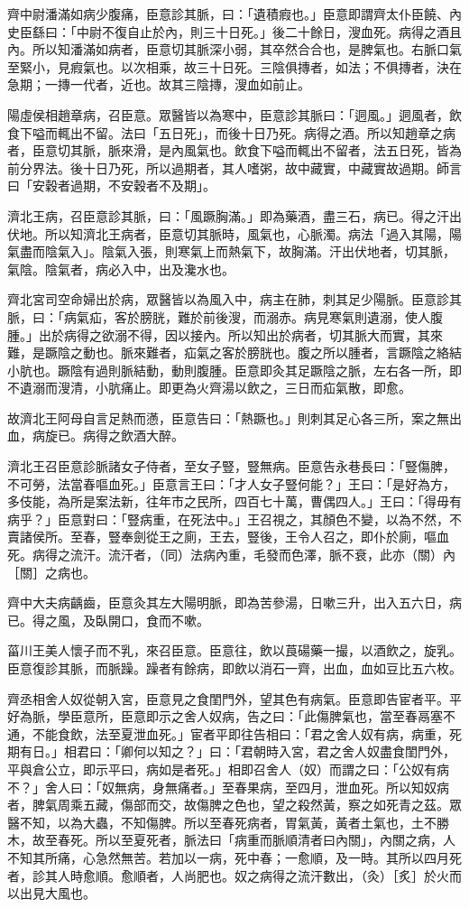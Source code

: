 \begin{pinyinscope}
齊中尉潘滿如病少腹痛，臣意診其脈，曰：「遺積瘕也。」臣意即謂齊太仆臣饒、內史臣繇曰：「中尉不復自止於內，則三十日死。」後二十餘日，溲血死。病得之酒且內。所以知潘滿如病者，臣意切其脈深小弱，其卒然合合也，是脾氣也。右脈口氣至緊小，見瘕氣也。以次相乘，故三十日死。三陰俱摶者，如法；不俱摶者，決在急期；一摶一代者，近也。故其三陰摶，溲血如前止。

陽虛侯相趙章病，召臣意。眾醫皆以為寒中，臣意診其脈曰：「迵風。」迵風者，飲食下嗌而輒出不留。法曰「五日死」，而後十日乃死。病得之酒。所以知趙章之病者，臣意切其脈，脈來滑，是內風氣也。飲食下嗌而輒出不留者，法五日死，皆為前分界法。後十日乃死，所以過期者，其人嗜粥，故中藏實，中藏實故過期。師言曰「安穀者過期，不安穀者不及期」。

濟北王病，召臣意診其脈，曰：「風蹶胸滿。」即為藥酒，盡三石，病已。得之汗出伏地。所以知濟北王病者，臣意切其脈時，風氣也，心脈濁。病法「過入其陽，陽氣盡而陰氣入」。陰氣入張，則寒氣上而熱氣下，故胸滿。汗出伏地者，切其脈，氣陰。陰氣者，病必入中，出及瀺水也。

齊北宮司空命婦出於病，眾醫皆以為風入中，病主在肺，刺其足少陽脈。臣意診其脈，曰：「病氣疝，客於膀胱，難於前後溲，而溺赤。病見寒氣則遺溺，使人腹腫。」出於病得之欲溺不得，因以接內。所以知出於病者，切其脈大而實，其來難，是蹶陰之動也。脈來難者，疝氣之客於膀胱也。腹之所以腫者，言蹶陰之絡結小肮也。蹶陰有過則脈結動，動則腹腫。臣意即灸其足蹶陰之脈，左右各一所，即不遺溺而溲清，小肮痛止。即更為火齊湯以飲之，三日而疝氣散，即愈。

故濟北王阿母自言足熱而懣，臣意告曰：「熱蹶也。」則刺其足心各三所，案之無出血，病旋已。病得之飲酒大醉。

濟北王召臣意診脈諸女子侍者，至女子豎，豎無病。臣意告永巷長曰：「豎傷脾，不可勞，法當春嘔血死。」臣意言王曰：「才人女子豎何能？」王曰：「是好為方，多伎能，為所是案法新，往年市之民所，四百七十萬，曹偶四人。」王曰：「得毋有病乎？」臣意對曰：「豎病重，在死法中。」王召視之，其顏色不變，以為不然，不賣諸侯所。至春，豎奉劍從王之廁，王去，豎後，王令人召之，即仆於廁，嘔血死。病得之流汗。流汗者，（同）法病內重，毛發而色澤，脈不衰，此亦（關）內［關］之病也。

齊中大夫病齲齒，臣意灸其左大陽明脈，即為苦參湯，日嗽三升，出入五六日，病已。得之風，及臥開口，食而不嗽。

菑川王美人懷子而不乳，來召臣意。臣意往，飲以莨碭藥一撮，以酒飲之，旋乳。臣意復診其脈，而脈躁。躁者有餘病，即飲以消石一齊，出血，血如豆比五六枚。

齊丞相舍人奴從朝入宮，臣意見之食閨門外，望其色有病氣。臣意即告宦者平。平好為脈，學臣意所，臣意即示之舍人奴病，告之曰：「此傷脾氣也，當至春鬲塞不通，不能食飲，法至夏泄血死。」宦者平即往告相曰：「君之舍人奴有病，病重，死期有日。」相君曰：「卿何以知之？」曰：「君朝時入宮，君之舍人奴盡食閨門外，平與倉公立，即示平曰，病如是者死。」相即召舍人（奴）而謂之曰：「公奴有病不？」舍人曰：「奴無病，身無痛者。」至春果病，至四月，泄血死。所以知奴病者，脾氣周乘五藏，傷部而交，故傷脾之色也，望之殺然黃，察之如死青之茲。眾醫不知，以為大蟲，不知傷脾。所以至春死病者，胃氣黃，黃者土氣也，土不勝木，故至春死。所以至夏死者，脈法曰「病重而脈順清者曰內關」，內關之病，人不知其所痛，心急然無苦。若加以一病，死中春；一愈順，及一時。其所以四月死者，診其人時愈順。愈順者，人尚肥也。奴之病得之流汗數出，（灸）［炙］於火而以出見大風也。


\end{pinyinscope}
